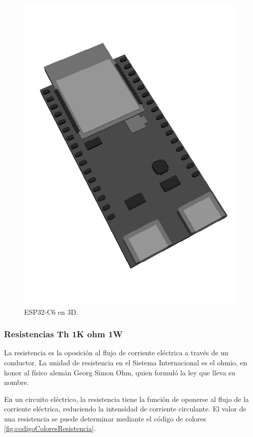     \begin{figure}[H]
        \centering
        \includegraphics[scale=0.4]{15/img/eSP32Modelo.pdf}
        \caption{ESP32-C6 en 3D.}
        \label{fig:eSP332Modelo}
    \end{figure}
    
    \subsubsection{Resistencias Th 1K ohm 1W}
    
    La resistencia es la oposición al flujo de corriente eléctrica a través de un conductor. La unidad de resistencia en el Sistema Internacional es el ohmio, en honor al físico alemán Georg Simon Ohm, quien formuló la ley que lleva su nombre.
    
    En un circuito eléctrico, la resistencia tiene la función de oponerse al flujo de la corriente eléctrica, reduciendo la intensidad de corriente circulante. El valor de una resistencia se puede determinar mediante el código de colores \ref{fig:codigoColoresResistencia}. 
    
